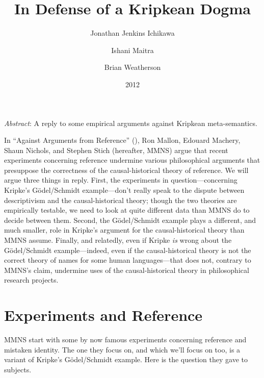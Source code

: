 \documentclass[
  11pt,
  letterpaper,
  DIV=11,
  numbers=noendperiod,
  twoside]{scrartcl}
\title{In Defense of a Kripkean Dogma}
\author{Jonathan Jenkins Ichikawa \and Ishani Maitra \and Brian
Weatherson}
\date{2012}
\renewenvironment{abstract}
 {\vspace{-1.25cm}
 \quotation\small\noindent\emph{Abstract}:}
 {\endquotation}
\renewenvironment{abstract}
 {\quotation\small\noindent\emph{Abstract}:}
 {\endquotation\vspace{-0.02cm}}
\begin{document}
\maketitle
\begin{abstract}
A reply to some empirical arguments against Kripkean meta-semantics.
\end{abstract}


In ``Against Arguments from Reference'' (), Ron Mallon, Edouard Machery, Shaun Nichols, and Stephen
Stich (hereafter, MMNS) argue that recent experiments concerning
reference undermine various philosophical arguments that presuppose the
correctness of the causal-historical theory of reference. We will argue
three things in reply. First, the experiments in question---concerning
Kripke's Gödel/Schmidt example---don't really speak to the dispute
between descriptivism and the causal-historical theory; though the two
theories are empirically testable, we need to look at quite different
data than MMNS do to decide between them. Second, the Gödel/Schmidt
example plays a different, and much smaller, role in Kripke's argument
for the causal-historical theory than MMNS assume. Finally, and
relatedly, even if Kripke \emph{is} wrong about the Gödel/Schmidt
example---indeed, even if the causal-historical theory is not the
correct theory of names for some human languages---that does not,
contrary to MMNS's claim, undermine uses of the causal-historical theory
in philosophical research projects.

\section{Experiments and Reference}\label{experiments-and-reference}

MMNS start with some by now famous experiments concerning reference and
mistaken identity. The one they focus on, and which we'll focus on too,
is a variant of Kripke's Gödel/Schmidt example. Here is the question
they gave to subjects.
\end{document}
